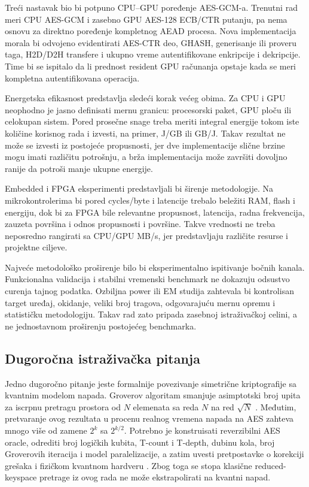 Treći nastavak bio bi potpuno CPU--GPU poređenje AES-GCM-a. Trenutni rad
meri CPU AES-GCM i zasebno GPU AES-128 ECB/CTR putanju, pa nema osnovu za
direktno poređenje kompletnog AEAD procesa. Nova implementacija morala bi
odvojeno evidentirati AES-CTR deo, GHASH, generisanje ili proveru taga,
H2D/D2H transfere i ukupno vreme autentifikovane enkripcije i
dekripcije. Time bi se ispitalo da li prednost resident GPU računanja
opstaje kada se meri kompletna autentifikovana operacija.

Energetska efikasnost predstavlja sledeći korak većeg obima. Za CPU i GPU
neophodno je jasno definisati mernu granicu: procesorski paket, GPU ploču
ili celokupan sistem. Pored prosečne snage treba meriti integral energije
tokom iste količine korisnog rada i izvesti, na primer, J/GB ili GB/J.
Takav rezultat ne može se izvesti iz postojeće propusnosti, jer dve
implementacije slične brzine mogu imati različitu potrošnju, a brža
implementacija može završiti dovoljno ranije da potroši manje ukupne
energije.

Embedded i FPGA eksperimenti predstavljali bi širenje metodologije.
Na mikrokontrolerima bi pored cycles/byte i latencije trebalo beležiti
RAM, flash i energiju, dok bi za FPGA bile relevantne propusnost,
latencija, radna frekvencija, zauzeta površina i odnos propusnosti i
površine. Takve vrednosti ne treba neposredno rangirati sa CPU/GPU MB/s,
jer predstavljaju različite resurse i projektne ciljeve.

Najveće metodološko proširenje bilo bi eksperimentalno ispitivanje bočnih
kanala. Funkcionalna validacija i stabilni vremenski benchmark ne dokazuju
odsustvo curenja tajnog podatka. Ozbiljna power ili EM studija zahtevala
bi kontrolisan target uređaj, okidanje, veliki broj tragova, odgovarajuću
mernu opremu i statističku metodologiju. Takav rad zato pripada zasebnoj
istraživačkoj celini, a ne jednostavnom proširenju postojećeg benchmarka.


\subsection{Dugoročna istraživačka pitanja}

Jedno dugoročno pitanje jeste formalnije povezivanje simetrične
kriptografije sa kvantnim modelom napada. Groverov algoritam smanjuje
asimptotski broj upita za iscrpnu pretragu prostora od $N$ elemenata sa
reda $N$ na red $\sqrt{N}$ \cite{grover1996}. Međutim, pretvaranje ovog
rezultata u procenu realnog vremena napada na AES zahteva mnogo više od
zamene $2^k$ sa $2^{k/2}$. Potrebno je konstruisati reverzibilni AES
oracle, odrediti broj logičkih kubita, T-count i T-depth, dubinu kola,
broj Groverovih iteracija i model paralelizacije, a zatim uvesti pretpostavke
o korekciji grešaka i fizičkom kvantnom hardveru
\cite{GrasslEtAl2016AESQuantum,JaquesEtAl2020GroverAES}.
Zbog toga se stopa klasične reduced-keyspace pretrage iz ovog rada ne
može ekstrapolirati na kvantni napad.

